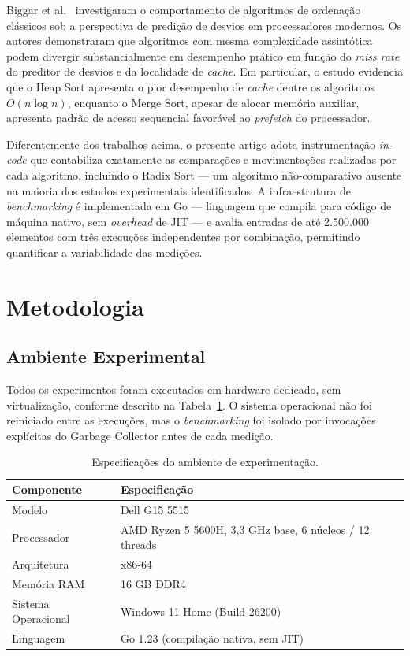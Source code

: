 \documentclass[12pt]{article}
\begin{document}
Biggar et al.~\cite{biggar2008} investigaram o comportamento de
algoritmos de ordenação clássicos sob a perspectiva de predição de
desvios em processadores modernos. Os autores demonstraram que
algoritmos com mesma complexidade assintótica podem divergir
substancialmente em desempenho prático em função do
\textit{miss rate} do preditor de desvios e da localidade de
\textit{cache}. Em particular, o estudo evidencia que o Heap Sort
apresenta o pior desempenho de \textit{cache} dentre os algoritmos
$O(n \log n)$, enquanto o Merge Sort, apesar de alocar memória
auxiliar, apresenta padrão de acesso sequencial favorável ao
\textit{prefetch} do processador.

Diferentemente dos trabalhos acima, o presente artigo adota
instrumentação \textit{in-code} que contabiliza exatamente as
comparações e movimentações realizadas por cada algoritmo,
incluindo o Radix Sort --- um algoritmo não-comparativo ausente
na maioria dos estudos experimentais identificados. A
infraestrutura de \textit{benchmarking} é implementada em Go
--- linguagem que compila para código de máquina nativo, sem
\textit{overhead} de JIT --- e avalia entradas de até
2.500.000 elementos com três execuções independentes por
combinação, permitindo quantificar a variabilidade das medições.

\section{Metodologia}
\label{sec:method}

\subsection{Ambiente Experimental}

Todos os experimentos foram executados em hardware dedicado,
sem virtualização, conforme descrito na Tabela~\ref{tab:hardware}.
O sistema operacional não foi reiniciado entre as execuções,
mas o \textit{benchmarking} foi isolado por invocações explícitas
do Garbage Collector antes de cada medição.

\begin{table}[ht]
\centering
\caption{Especificações do ambiente de experimentação.}
\label{tab:hardware}
\begin{tabular}{ll}
\toprule
\textbf{Componente} & \textbf{Especificação} \\
\midrule
Modelo              & Dell G15 5515 \\
Processador         & AMD Ryzen 5 5600H, 3,3 GHz base, 6 núcleos / 12 threads \\
Arquitetura         & x86-64 \\
Memória RAM         & 16 GB DDR4 \\
Sistema Operacional & Windows 11 Home (Build 26200) \\
Linguagem           & Go 1.23 (compilação nativa, sem JIT) \\
\bottomrule
\end{tabular}
\end{table}
\end{document}
